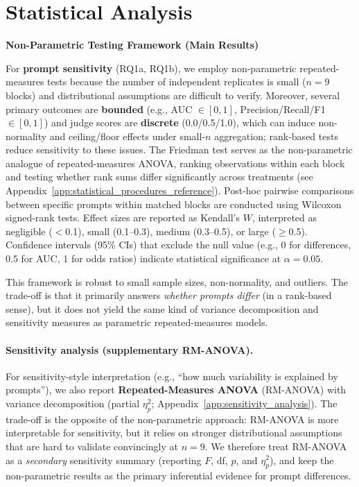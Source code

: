\section{Statistical Analysis}

\noindent\textbf{Non-Parametric Testing Framework (Main Results)}
\label{sec:nonparam_framework}

For \textbf{prompt sensitivity} (RQ1a, RQ1b), we employ non-parametric repeated-measures tests because the number of independent replicates is small ($n=9$ blocks) and distributional assumptions are difficult to verify. Moreover, several primary outcomes are \textbf{bounded} (e.g., AUC $\in[0,1]$, Precision/Recall/F1 $\in[0,1]$) and judge scores are \textbf{discrete} (0.0/0.5/1.0), which can induce non-normality and ceiling/floor effects under small-$n$ aggregation; rank-based tests reduce sensitivity to these issues. The Friedman test serves as the non-parametric analogue of repeated-measures ANOVA, ranking observations within each block and testing whether rank sums differ significantly across treatments (see Appendix~\ref{app:statistical_procedures_reference}). Post-hoc pairwise comparisons between specific prompts within matched blocks are conducted using Wilcoxon signed-rank tests. Effect sizes are reported as Kendall's $W$, interpreted as negligible ($<$0.1), small (0.1--0.3), medium (0.3--0.5), or large ($\geq$0.5). Confidence intervals (95\% CIs) that exclude the null value (e.g., 0 for differences, 0.5 for AUC, 1 for odds ratios) indicate statistical significance at $\alpha=0.05$.

This framework is robust to small sample sizes, non-normality, and outliers. The trade-off is that it primarily answers \textit{whether prompts differ} (in a rank-based sense), but it does not yield the same kind of variance decomposition and sensitivity measures as parametric repeated-measures models.

\paragraph{Sensitivity analysis (supplementary RM-ANOVA).}
\label{sec:prompt_sensitivity_rationale}
For sensitivity-style interpretation (e.g., ``how much variability is explained by prompts''), we also report \textbf{Repeated-Measures ANOVA} (RM-ANOVA) with variance decomposition (partial $\eta^2_p$; Appendix~\ref{app:sensitivity_analysis}). The trade-off is the opposite of the non-parametric approach: RM-ANOVA is more interpretable for sensitivity, but it relies on stronger distributional assumptions that are hard to validate convincingly at $n=9$. We therefore treat RM-ANOVA as a \textit{secondary} sensitivity summary (reporting $F$, df, $p$, and $\eta^2_p$), and keep the non-parametric results as the primary inferential evidence for prompt differences.

